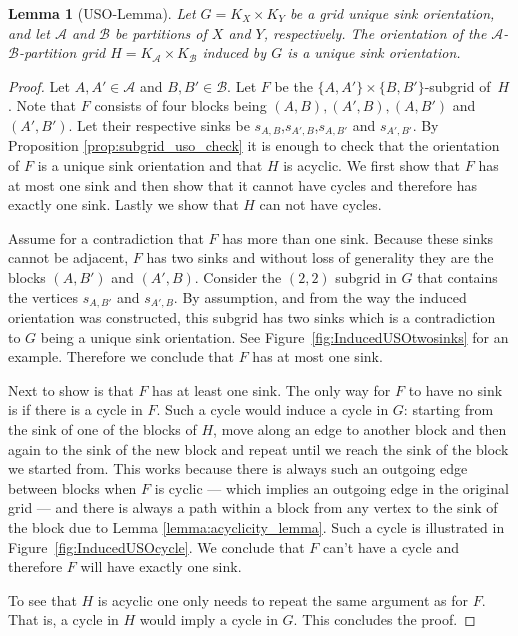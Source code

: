 \documentclass[a4paper,10pt]{article}
\newtheorem{lemma}{Lemma}
\newcommand{\A}{\ensuremath{\mathcal A}}
\newcommand{\B}{\ensuremath{\mathcal B}}
\newcommand{\s}[1]{\ensuremath{s_{\scriptscriptstyle#1}}}
\begin{document}
\begin{lemma}[USO-Lemma]\label{lemma:USO-Lemma}
Let $G = K_X \times K_Y$ be a grid unique sink orientation,
and let $\A$ and $\B$ be partitions of $X$ and $Y$, respectively.
The orientation of the $\A$-$\B$-partition grid $H = K_\A \times K_\B$ induced by $G$ is a unique sink orientation.
\end{lemma}

\begin{proof}
Let $A, A'\in \A$ and $B,B'\in \B$. Let $F$ be the $\{A,A'\}\times\{B, B'\}$-subgrid of~$H$.
Note that $F$ consists of four blocks being $(A,B), (A', B), (A, B')$ and $(A', B')$. Let their respective sinks be $s_{A,B}$,$s_{A',B}$,$s_{A,B'}$ and $s_{A',B'}$.
By Proposition \ref{prop:subgrid_uso_check} it is enough to check that the orientation of $F$ is a unique sink orientation and that $H$ is acyclic.
We first show that $F$ has at most one sink and then show that it cannot have cycles and therefore has exactly one sink. Lastly we show that $H$ can not have cycles.

Assume for a contradiction that $F$ has more than one sink.
Because these sinks cannot be adjacent, $F$ has two sinks and without loss of generality they are the blocks $(A,B')$ and $(A', B)$. Consider the $(2,2)$ subgrid in $G$ that contains the vertices $\s{A,B'}$ and $\s{A',B}$. By assumption, and from the way the induced orientation was constructed, this subgrid has two sinks which is a contradiction to $G$ being a unique sink orientation. See Figure~\ref{fig:InducedUSOtwosinks} for an example. Therefore we conclude that $F$ has at most one sink. 

Next to show is that $F$ has at least one sink. The only way for $F$ to have no sink is if there is a cycle in $F$. Such a cycle would induce a cycle in $G$: starting from the sink of one of the blocks of $H$, move along an edge to another block and then again to the sink of the new block and repeat until we reach the sink of the block we started from. This works because there is always such an outgoing edge between blocks when $F$ is cyclic --- which implies an outgoing edge in the original grid --- and there is always a path within a block from any vertex to the sink of the block due to Lemma \ref{lemma:acyclicity_lemma}. Such a cycle is illustrated in Figure~\ref{fig:InducedUSOcycle}. We conclude that $F$ can't have a cycle and therefore $F$ will have exactly one sink.

To see that $H$ is acyclic one only needs to repeat the same argument as for $F$. That is, a cycle in $H$ would imply a cycle in $G$. This concludes the proof.


\end{proof}
\end{document}
